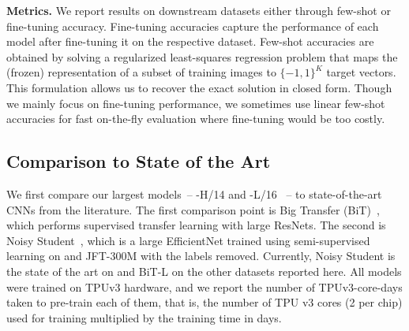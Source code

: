 \textbf{Metrics.}
We report results on downstream datasets either through few-shot or fine-tuning accuracy.
Fine-tuning accuracies capture the performance of each model after fine-tuning it on the respective dataset.
Few-shot accuracies are obtained by solving a regularized least-squares regression problem that maps the (frozen) representation of a subset of training images to $\{-1,1\}^K$ target vectors.
This formulation allows us to recover the exact solution in closed form.
Though we mainly focus on fine-tuning performance, we sometimes use linear few-shot accuracies for fast on-the-fly evaluation where fine-tuning would be too costly.

\subsection{Comparison to State of the Art}

We first compare our largest models~-- \oursabbrv-H/14 and \oursabbrv-L/16 ~-- to state-of-the-art CNNs from the literature.
The first comparison point is Big Transfer (BiT)~\citep{kolesnikov2020-bit}, which performs supervised transfer learning with large ResNets.
The second is Noisy Student~\citep{xie2020-noisystudent},
which is a large EfficientNet trained using semi-supervised learning on \imagenet and JFT-300M with the labels removed.
Currently, Noisy Student is the state of the art on \imagenet and BiT-L on the other datasets reported here.
All models were trained on TPUv3 hardware, and we report the number of TPUv3-core-days taken to pre-train each of them, that is, the number of TPU v3 cores (2 per chip) used for training multiplied by the training time in days.

